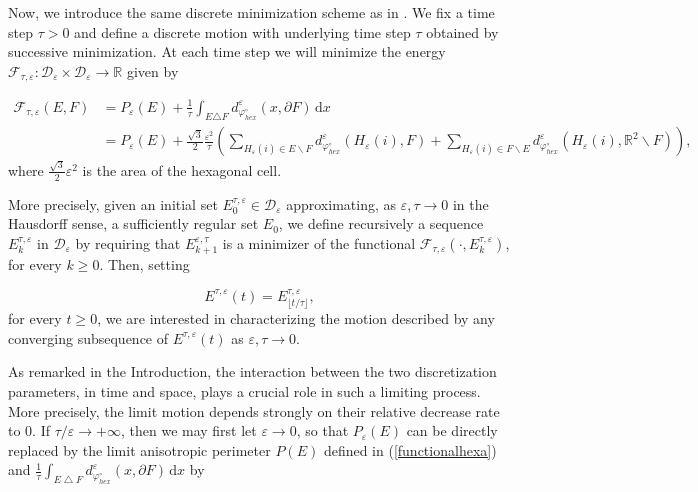 \documentclass{interact}
\numberwithin{equation}{section}
\theoremstyle{definition}
\newcommand{\R}{\mathbb{R}}
\newcommand{\D}{\mathcal{D}}
\renewcommand{\epsilon}{\varepsilon}
\begin{document}
Now, we introduce the same discrete minimization scheme as in \cite{BGN}. We fix a time step $\tau>0$ and define a discrete motion with underlying time step $\tau$ obtained by successive minimization. At each time step we will minimize the energy $\mathcal{F}_{\tau,\epsilon}:\D_\epsilon\times\D_\epsilon\to\R$ given by

\begin{equation}
\begin{split}
\mathcal{F}_{\tau,\epsilon}(E,F)&= P_\epsilon(E)+\frac{1}{\tau}\int_{E\triangle F}d_{\varphi^\circ_{hex}}^\epsilon(x,\partial F)\,\mathrm{d}x\\
&= P_\epsilon(E)+\frac{\sqrt{3}}{2}\frac{\epsilon^2}{\tau}\left(\sum_{H_\epsilon(i)\in E\backslash F} d_{\varphi^\circ_{hex}}^\epsilon(H_\epsilon(i),F)+\sum_{H_\epsilon(i)\in F\backslash E} d_{\varphi^\circ_{hex}}^\epsilon(H_\epsilon(i),\mathbb{R}^2\backslash F)\right),
\end{split}
\label{newenergy}
\end{equation}
where $\frac{\sqrt{3}}{2}\epsilon^2$ is the area of the hexagonal cell.



More precisely, given an initial set $E_0^{\tau,\epsilon}\in\mathcal{D}_\varepsilon$ approximating, as $\varepsilon,\tau\to0$ in the Hausdorff sense, a sufficiently regular set $E_0$, we define recursively a sequence $E^{\tau,\epsilon}_k$ in $\D_\epsilon$ by requiring that
$E^{\epsilon,\tau}_{k+1}$ is a minimizer of the functional $\mathcal{F}_{\tau,\epsilon}(\cdot,E^{\tau,\epsilon}_k)$, for every $k\geq0$.
Then, setting 

\begin{equation}\label{disefo}
E^{\tau,\epsilon}(t)=E^{\tau,\epsilon}_{\lfloor t\slash\tau\rfloor},
\end{equation}
for every $t\geq0$, we are interested in characterizing the motion described by any converging subsequence of $E^{\tau,\epsilon}(t)$ as $\epsilon,\tau\to0$. 



As remarked in the Introduction, the interaction between the two discretization parameters, in time and space, plays a crucial role in such a limiting process. More precisely, the limit motion depends strongly on their relative decrease rate to 0. If $\tau/\epsilon\to+\infty$, then we may first let $\epsilon\to0$, so that $P_\epsilon(E)$ can be directly replaced by the limit anisotropic perimeter $P(E)$ defined in (\ref{functionalhexa}) and $\frac{1}{\tau}\int_{E\bigtriangleup F}d_{\varphi^\circ_{hex}}^\epsilon(x,\partial F)\,\mathrm{d}x$ by 
\end{document}
